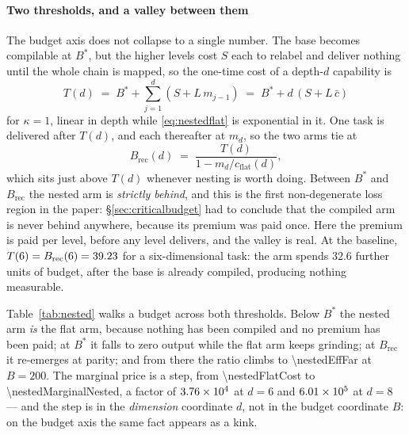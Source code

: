 \documentclass[conference]{IEEEtran}
\theoremstyle{definition}
\begin{document}
\paragraph{Two thresholds, and a valley between them} The budget axis does not
collapse to a single number. The base becomes compilable at $B^{*}$, but the
higher levels cost $S$ each to relabel and deliver nothing until the whole chain
is mapped, so the one-time cost of a depth-$d$ capability is
\begin{equation}
T(d)\;=\;B^{*}+\sum_{j=1}^{d}(S+L\,m_{j-1})
\;=\;B^{*}+d\,(S+L\,\bar c)
\label{eq:nestedbuild}
\end{equation}
for $\kappa=1$, linear in depth while \eqref{eq:nestedflat} is exponential in it. One task is
delivered after $T(d)$, and each thereafter at $m_d$, so the two arms tie at
\begin{equation}
B_{\text{rec}}(d)\;=\;\frac{T(d)}{1-m_d/c_{\text{flat}}(d)},
\label{eq:nestedbrec}
\end{equation}
which sits just above $T(d)$ whenever nesting is worth doing. Between $B^{*}$ and
$B_{\text{rec}}$ the nested arm is \emph{strictly behind}, and this is the first
non-degenerate loss region in the paper: \S\ref{sec:criticalbudget} had to conclude
that the compiled arm is never behind anywhere, because its premium was paid once.
Here the premium is paid per level, before any level delivers, and the valley is
real. At the baseline, $T(6)=B_{\text{rec}}(6)=\num{39.23}$ for a
six-dimensional task: the arm spends $32.6$ further units of budget, after the
base is already compiled, producing nothing measurable.

Table~\ref{tab:nested} walks a budget across both thresholds. Below $B^{*}$ the
nested arm \emph{is} the flat arm, because nothing has been compiled and no
premium has been paid; at $B^{*}$ it falls to zero output while the flat arm keeps
grinding; at $B_{\text{rec}}$ it re-emerges at parity; and from there the ratio
climbs to \num{\nestedEffFar} at $B=200$. The marginal price is a step, from
\num{\nestedFlatCost} to \num{\nestedMarginalNested}, a factor of
$3.76\times10^{4}$ at $d=6$ and
$6.01\times10^{5}$ at $d=8$ --- and the step
is in the \emph{dimension} coordinate $d$, not in the budget coordinate $B$:
on the budget axis the same fact appears as a kink.

\begin{table}[t]
\centering
\caption{Experiment K. The loss region and the take-off. Both arms complete
top-level tasks of dimension depth $d=6$ with branching $L=\nestedBranch$
against a budget $B$, at $c_v=1$, $c_c=0.01$, $\rho=0.1$, $S=\nestedPremium$,
$\kappa=1$. The nested arm falls to zero at $B^{*}=\num{\nestedBstar}$ --- not because
compiling is dear, but because the per-level premium is being paid and nothing has
been delivered --- and breaks even at $B_{\text{rec}}=\num{\nestedBrec}$. The final
column is the ratio of completed tasks; ``--'' is zero.}
\label{tab:nested}
\footnotesize

\end{table}
\end{document}
